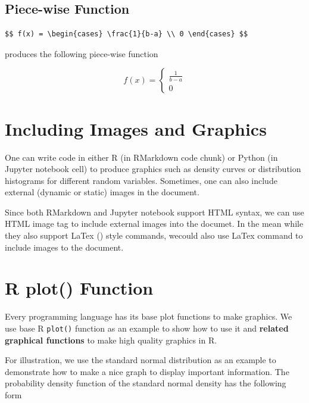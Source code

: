 \documentclass[
]{book}
\begin{document}
\hypertarget{piece-wise-function}{%
\subsection{Piece-wise Function}\label{piece-wise-function}}

\begin{verbatim}
$$ f(x) = \begin{cases} \frac{1}{b-a} \\ 0 \end{cases} $$
\end{verbatim}

produces the following piece-wise function

\[ f(x) = \begin{cases} \frac{1}{b-a} \\ 0 \end{cases} \]

\hypertarget{including-images-and-graphics}{%
\section{Including Images and Graphics}\label{including-images-and-graphics}}

One can write code in either R (in RMarkdown code chunk) or Python (in Jupyter notebook cell) to produce graphics such as density curves or distribution histograms for different random variables. Sometimes, one can also include external (dynamic or static) images in the document.

Since both RMarkdown and Jupyter notebook support HTML syntax, we can use HTML image tag to include external images into the documet. In the mean while they also support LaTex () style commands, wecould also use LaTex command to include images to the document.

\hypertarget{r-plot-function}{%
\section{R plot() Function}\label{r-plot-function}}

Every programming language has its base plot functions to make graphics. We use base R \texttt{plot()} function as an example to show how to use it and \textbf{related graphical functions} to make high quality graphics in R.

For illustration, we use the standard normal distribution as an example to demonstrate how to make a nice graph to display important information. The probability density function of the standard normal density has the following form
\end{document}
